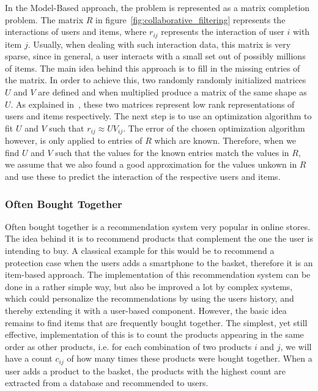 In the Model-Based approach, the problem is represented as a matrix completion problem.
The matrix $R$ in figure~\ref{fig:collaborative_filtering} represents the interactions of users and items, where $r_{ij}$ represents the interaction of user $i$ with item $j$.
Usually, when dealing with such interaction data, this matrix is very sparse, since in general, a user interacts with a small set out of possibly millions of items.
The main idea behind this approach is to fill in the missing entries of the matrix.
In order to achieve this, two randomly randomly initialized matrices $U$ and $V$ are defined and when multiplied produce a matrix of the same shape as $U$.
As explained in~\cite{collaborative_filtering}, these two matrices represent low rank representations of users and items respectively.
The next step is to use an optimization algorithm to fit $U$ and $V$ such that $r_{ij} \approx UV_{ij}$.
The error of the chosen optimization algorithm however, is only applied to entries of $R$ which are known.
Therefore, when we find $U$ and $V$ such that the values for the known entries match the values in $R$, we assume that we also found a good approximation for the values unkown in $R$ and use these to predict the interaction of the respective users and items.

\subsubsection{Often Bought Together}\label{sec:often_bought_together}
Often bought together is a recommendation system very popular in online stores.
The idea behind it is to recommend products that complement the one the user is intending to buy.
A classical example for this would be to recommend a protection case when the users adds a smartphone to the basket, therefore it is an item-based approach.
The implementation of this recommendation system can be done in a rather simple way, but also be improved a lot by complex systems, which could personalize the recommendations by using the users history, and thereby extending it with a user-based component.
However, the basic idea remains to find items that are frequently bought together.
The simplest, yet still effective, implementation of this is to count the products appearing in the same order as other products, i.e. for each combination of two products $i$ and $j$, we will have a count $c_{ij}$ of how many times these products were bought together.
When a user adds a product to the basket, the products with the highest count are extracted from a database and recommended to users.

